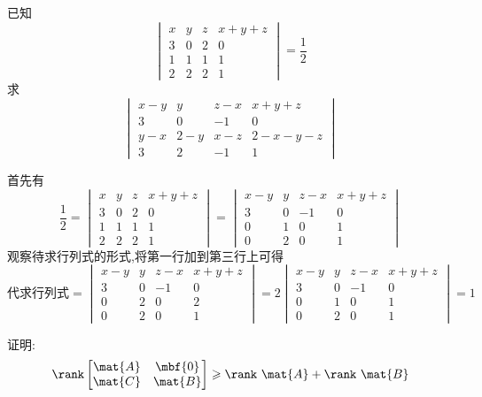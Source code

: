 \documentclass{ctexart}
\begin{document}
\begin{homework}[4]
    已知
    \[\begin{vmatrix}
        x&y&z&x+y+z\\
        3&0&2&0\\
        1&1&1&1\\
        2&2&2&1
    \end{vmatrix}=\dfrac12\]
    求
    \[\begin{vmatrix}
        x-y&y&z-x&x+y+z\\
        3&0&-1&0\\
        y-x&2-y&x-z&2-x-y-z\\
        3&2&-1&1
    \end{vmatrix}\]
\end{homework}
\begin{solution}
    首先有
    \[\dfrac12=\begin{vmatrix}
        x&y&z&x+y+z\\
        3&0&2&0\\
        1&1&1&1\\
        2&2&2&1
    \end{vmatrix}=\begin{vmatrix}
        x-y&y&z-x&x+y+z\\
        3&0&-1&0\\
        0&1&0&1\\
        0&2&0&1
    \end{vmatrix}\]
    观察待求行列式的形式,将第一行加到第三行上可得
    \[\text{代求行列式}=\begin{vmatrix}
        x-y&y&z-x&x+y+z\\
        3&0&-1&0\\
        0&2&0&2\\
        0&2&0&1
    \end{vmatrix}=2\begin{vmatrix}
        x-y&y&z-x&x+y+z\\
        3&0&-1&0\\
        0&1&0&1\\
        0&2&0&1
    \end{vmatrix}=1\]
\end{solution}
\begin{homework}[5]
    证明:
    \[\rank\begin{bmatrix}
        \mat{A}&\mbf{0}\\
        \mat{C}&\mat{B}
    \end{bmatrix}\geqslant\rank\ \mat{A}+\rank\ \mat{B}\]
\end{homework}
\end{document}
